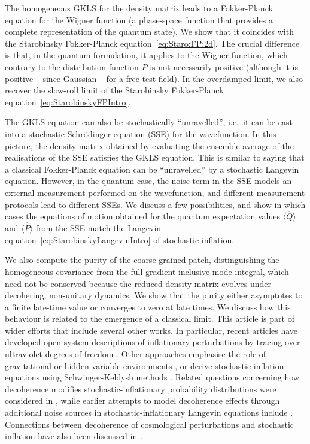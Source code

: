 \documentclass{article}
\numberwithin{equation}{section}
\begin{document}
	The homogeneous GKLS for the density matrix leads to a Fokker-Planck equation for the Wigner function (a phase-space function that provides a complete representation of the quantum state). We show that it coincides with the Starobinsky Fokker-Planck equation~\eqref{eq:Staro:FP:2d}. The crucial difference is that, in the quantum formulation, it applies to the Wigner function, which contrary to the distribution function $P$ is not necessarily positive (although it is positive -- since Gaussian -- for a free test field). In the overdamped limit, we also recover the slow-roll limit of the Starobinsky Fokker-Planck equation~\eqref{eq:StarobinskyFPIntro}. 

    The GKLS equation can also be stochastically ``unravelled'', i.e.~it can be cast into a stochastic Schr\"odinger equation (SSE) for the wavefunction. In this picture, the density matrix obtained by evaluating the ensemble average of the realisations of the SSE satisfies the GKLS equation. This is similar to saying that a classical Fokker-Planck equation can be ``unravelled'' by a stochastic Langevin equation. However, in the quantum case, the noise term in the SSE models an external measurement performed on the wavefunction, and different measurement protocols lead to different SSEs. We discuss a few possibilities, and show in which cases the equations of motion obtained for the quantum expectation values $\langle \hat{Q} \rangle$ and $\langle \hat{P} \rangle$ from the SSE match the Langevin equation~\eqref{eq:StarobinskyLangevinIntro} of stochastic inflation. 
    
	We also compute the purity of the coarse-grained patch, distinguishing the homogeneous covariance from the full gradient-inclusive mode integral, which need not be conserved because the reduced density matrix evolves under decohering, non-unitary dynamics. We show that the purity either asymptotes to a finite late-time value or converges to zero at late times. We discuss how this behaviour is related to the emergence of a classical limit. This article is part of wider efforts that include several other works. In particular, recent articles have developed open-system descriptions of inflationary perturbations by tracing over ultraviolet degrees of freedom \cite{Burgess:2014eoa, Burgess:2022nwu, Colas:2022hlq, Colas:2022kfu, goldman2024lindbladian,Colas:2024ysu, Burgess:2024eng, Beneke:2026nlo,Cespedes:2026nrg, Lopez2025, Salcedo2026}. Other approaches emphasise the role of gravitational or hidden-variable environments \cite{Akama:2026ent}, or derive stochastic-inflation equations using Schwinger-Keldysh methods \cite{Tokuda:2017fdh,Tokuda:2018eqs,Gorbenko:2019rza,Cespedes:2023aal,Green:2025hmo,Ye:2026saa}. Related questions concerning how decoherence modifies stochastic-inflationary probability distributions were considered in \cite{Boddy:2016zkn}, while earlier attempts to model decoherence effects through additional noise sources in stochastic-inflationary Langevin equations include \cite{Haba:2018ork,Haba:2018akk}. Connections between decoherence of cosmological perturbations and stochastic inflation have also been discussed in \cite{Weenink:2011dd}.
\end{document}
